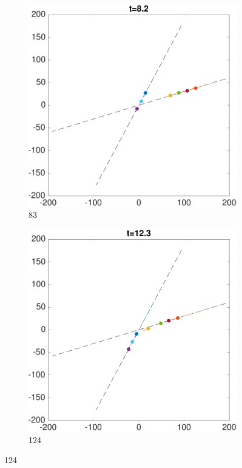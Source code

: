 \begin{figure} \label{fig:ch}
    \centering
    \begin{subfigure}{0.23\textwidth} \label{subfig:ch_83}
        \includegraphics[width=\textwidth]{fig/ch_83}
        \caption{83}
    \end{subfigure}
    \begin{subfigure}{0.23\textwidth} \label{subfig:ch_124}
        \includegraphics[width=\textwidth]{fig/ch_124}
        \caption{124}
    \end{subfigure}


\end{figure}
